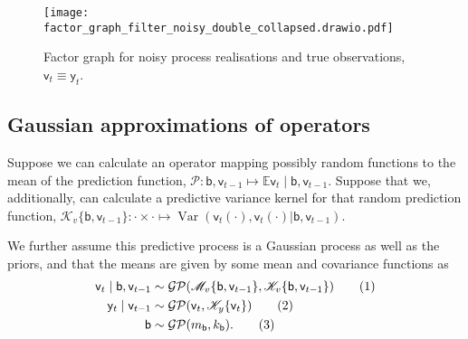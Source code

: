 \documentclass{article}
\newcommand\numberthis{\addtocounter{equation}{1}\tag{\theequation}}
\newcommand{\var}{\operatorname{Var}}
\newcommand{\rv}[1]{\mathsf{#1}}
\newcommand{\dist}[1]{\mathcal{#1}}
\newcommand{\op}[1]{\mathscr{#1}}
\newcommand{\gvn}{\mid}
\newcommand{\Ex}{\mathbb{E}}
\newcommand{\lat}{\rv{b}}   %
\begin{document}
\begin{figure}[htb]
  \centering
    \texttt{[image: factor\_graph\_filter\_noisy\_double\_collapsed.drawio.pdf]}
  \caption{Factor graph for noisy process realisations and true observations, \(\rv{v}_{t}\equiv \rv{y}_{t}\).}\label{fig:filteringfgnoisycollapsed2}
\end{figure}

\subsection{Gaussian approximations of operators}

Suppose we can calculate an operator mapping possibly random functions to the mean of the prediction function, \(\op{P}:\lat,\rv{v}_{t-1}\mapsto \Ex\rv{v}_{t}\gvn \lat,\rv{v}_{t-1}\).
Suppose that we, additionally, can calculate a predictive variance kernel for that random prediction function,
\(\op{K}_{v}\{\lat,\rv{v}_{t-1}\}: \cdot \times \cdot \mapsto \var\left(\rv{v}_{t}(\cdot), \rv{v}_{t}(\cdot)|\lat,\rv{v}_{t-1}\right)\).

We further assume this predictive process is a Gaussian process as well as the priors, and that the means are given by some mean and covariance functions as
\begin{align*}
\rv{v}_{t}\gvn \lat,\rv{v}_{t-1}
&\sim \dist{GP}(\op{M}_v\{\lat,\rv{v}_{t-1}\},\op{K}_{v}\{\lat,\rv{v}_{t-1}\})
\numberthis \label{eq:gp_approx_proc} \\
\rv{y}_{t}\gvn \rv{v}_{t-1}
&\sim \dist{GP}(\rv{v}_{t},\op{K}_{y}\{\rv{v}_{t}\})
\numberthis \label{eq:gp_approx_obs} \\
\lat &\sim \dist{GP}(m_{\lat},k_{\lat}).
\numberthis \label{eq:gp_approx_prior} 
\end{align*}

\end{document}
